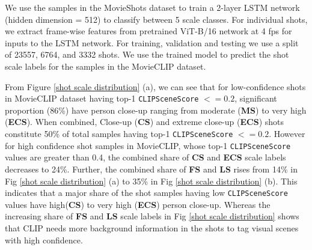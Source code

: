 We use the samples in the MovieShots dataset to train a 2-layer LSTM \cite{lstm} network (hidden dimension = 512) to classify between 5 scale classes. For individual shots, we extract frame-wise features from pretrained ViT-B/16 \cite{dosovitskiy2020vit} network at 4 fps for inputs to the LSTM network. For training, validation and testing we use a split of 23557, 6764, and 3332 shots. We use the trained model to predict the shot scale labels for the samples in the MovieCLIP dataset.
\par 
From Figure \ref{shot scale distribution} (a), we can see that for low-confidence shots in MovieCLIP dataset having top-1 \texttt{CLIPSceneScore} $<=0.2$, significant proportion (86\%) have person close-up ranging from moderate (\textbf{MS}) to very high (\textbf{ECS}). When combined, Close-up (\textbf{CS}) and extreme close-up (\textbf{ECS}) shots constitute 50\% of total samples having top-1 \texttt{CLIPSceneScore} $<=0.2$. However for high confidence shot samples in MovieCLIP, whose top-1 \texttt{CLIPSceneScore} values are greater than 0.4, the combined share of \textbf{CS} and \textbf{ECS} scale labels decreases to 24\%. Further, the combined share of \textbf{FS} and \textbf{LS} rises from 14\% in Fig \ref{shot scale distribution} (a) to 35\% in Fig \ref{shot scale distribution} (b). 
This indicates that a major share of the shot samples having low  \texttt{CLIPSceneScore} values have high(\textbf{CS}) to very high (\textbf{ECS}) person close-up. Whereas the increasing share of \textbf{FS} and \textbf{LS} scale labels in Fig \ref{shot scale distribution} shows that CLIP needs more background information in the shots to tag visual scenes with high confidence.
